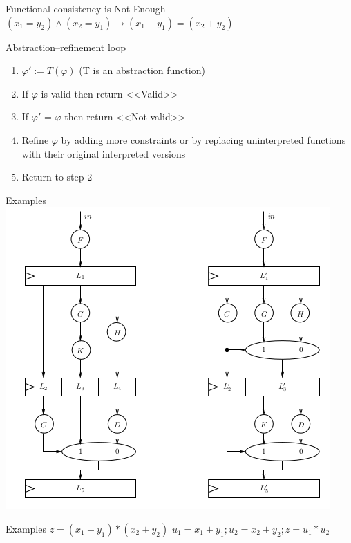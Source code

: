 \documentclass{beamer}
\begin{document}
\begin{frame}{Functional consistency is Not Enough}
$(x_1 = y_2) \wedge (x_2 = y_1) \rightarrow (x_1 + y_1) = (x_2 + y_2)$
\begin{block}{Abstraction–refinement loop}
\begin{enumerate}
\item $\varphi' := T(\varphi)$ (T is an abstraction function)
\item If $\varphi$ is valid then return <<Valid>>
\item If $\varphi'$ = $\varphi$ then return <<Not valid>>
\item Refine $\varphi$ by adding more constraints or by replacing uninterpreted functions with their original interpreted versions
\item Return to step 2
\end{enumerate}
\end{block}
\end{frame}

\begin{frame}{Examples}
\includegraphics[scale=0.5]{circuit.png}
\end{frame}

\begin{frame}{Examples}
$z = (x_1 + y_1) * (x_2 + y_2)$\newline
$u_1 = x_1 + y_1; u_2 = x_2 + y_2; z = u_1 * u_2$
\end{frame}
\end{document}
